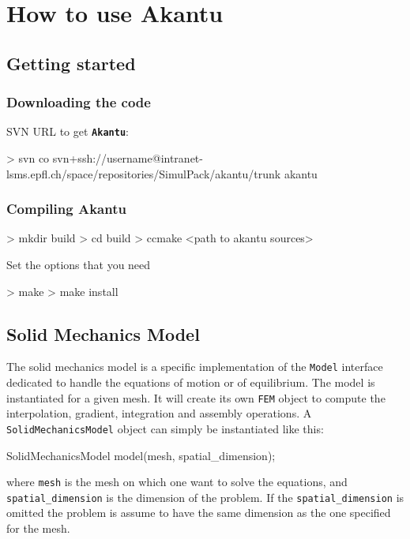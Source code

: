 \documentclass[a4paper,11pt]{book}
\newcommand{\akantu}{{\texttt{\textbf{Akantu}}}\xspace}
\newcommand{\code}[1]{\texttt{#1}}
\begin{document}
\chapter{How to use Akantu}
\section{Getting started}
\subsection{Downloading the code}
SVN URL to get \akantu :
\begin{command}
  > svn co svn+ssh://username@intranet-lsms.epfl.ch/space/repositories/SimulPack/akantu/trunk akantu
\end{command}

\subsection{Compiling Akantu}
\begin{command}
  > mkdir build
  > cd build
  > ccmake <path to akantu sources>
\end{command}

Set the options that you need

\begin{command}
  > make
  > make install
\end{command}

\section{Solid Mechanics Model}

The  solid mechanics  model is  a  specific implementation  of the  \code{Model}
interface dedicated  to handle  the equations of  motion or of  equilibrium. The
model  is instantiated  for a  given mesh.   It will  create its  own \code{FEM}
object  to  compute  the   interpolation,  gradient,  integration  and  assembly
operations. A \code{SolidMechanicsModel} object  can simply be instantiated like
this:
\begin{cpp}
  SolidMechanicsModel model(mesh, spatial_dimension);
\end{cpp}
where \code{mesh}  is the  mesh on which  one want  to solve the  equations, and
\code{spatial\_dimension}   is   the  dimension   of   the   problem.   If   the
\code{spatial\_dimension}  is omitted  the problem  is assume  to have  the same
dimension as the one specified for the mesh.
\end{document}
